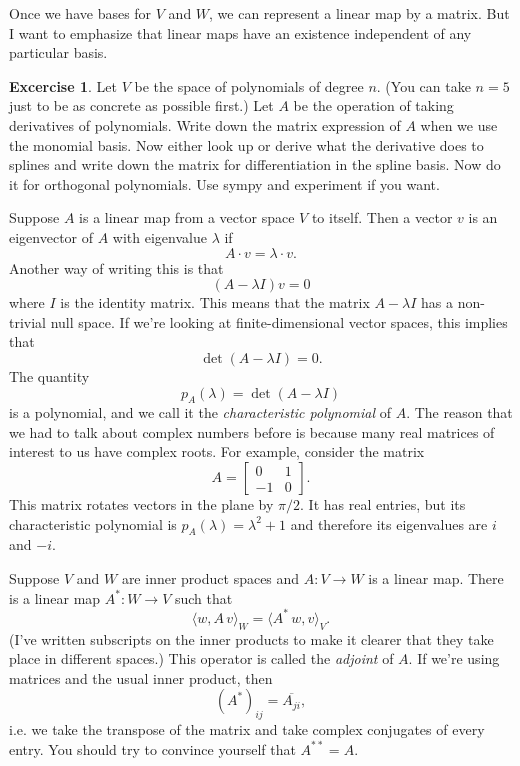 \documentclass{article}
\theoremstyle{definition}
\newtheorem*{exc}{Excercise}
\theoremstyle{plain}
\begin{document}
Once we have bases for $V$ and $W$, we can represent a linear map by a matrix.
But I want to emphasize that linear maps have an existence independent of any particular basis.

\begin{exc}
    Let $V$ be the space of polynomials of degree $n$.
    (You can take $n = 5$ just to be as concrete as possible first.)
    Let $A$ be the operation of taking derivatives of polynomials.
    Write down the matrix expression of $A$ when we use the monomial basis.
    Now either look up or derive what the derivative does to splines and write down the matrix for differentiation in the spline basis.
    Now do it for orthogonal polynomials.
    Use sympy and experiment if you want.
\end{exc}

Suppose $A$ is a linear map from a vector space $V$ to itself.
Then a vector $v$ is an eigenvector of $A$ with eigenvalue $\lambda$ if
\begin{equation}
    A\cdot v = \lambda\cdot v.
\end{equation}
Another way of writing this is that
\begin{equation}
    (A - \lambda I)v = 0
\end{equation}
where $I$ is the identity matrix.
This means that the matrix $A - \lambda I$ has a non-trivial null space.
If we're looking at finite-dimensional vector spaces, this implies that
\begin{equation}
    \det(A - \lambda I) = 0.
\end{equation}
The quantity
\begin{equation}
    p_A(\lambda) = \det(A - \lambda I)
\end{equation}
is a polynomial, and we call it the \emph{characteristic polynomial} of $A$.
The reason that we had to talk about complex numbers before is because many real matrices of interest to us have complex roots.
For example, consider the matrix
\begin{equation}
    A = \left[\begin{matrix} 0 & 1 \\ -1 & 0\end{matrix}\right].
\end{equation}
This matrix rotates vectors in the plane by $\pi / 2$.
It has real entries, but its characteristic polynomial is $p_A(\lambda) = \lambda^2 + 1$ and therefore its eigenvalues are $i$ and $-i$.

Suppose $V$ and $W$ are inner product spaces and $A : V \to W$ is a linear map.
There is a linear map $A^* : W \to V$ such that
\begin{equation}
    \langle w, A\,v\rangle_W = \langle A^*\,w, v\rangle_V.
\end{equation}
(I've written subscripts on the inner products to make it clearer that they take place in different spaces.)
This operator is called the \emph{adjoint} of $A$.
If we're using matrices and the usual inner product, then
\begin{equation}
    (A^*)_{ij} = \overline{A_{ji}},
\end{equation}
i.e. we take the transpose of the matrix and take complex conjugates of every entry.
You should try to convince yourself that $A^{**} = A$.
\end{document}
